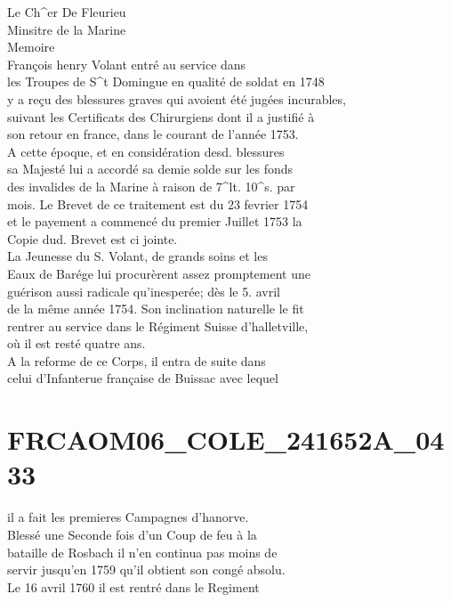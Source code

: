 \documentclass{article}
\begin{document}
\begin{pages}
Le Ch\^{}er De Fleurieu\\
Minsitre de la Marine\\
Memoire\\
François henry Volant entré au service dans\\
les Troupes de S\^{}t Domingue en qualité de soldat en 1748\\
y a reçu des blessures graves qui avoient été jugées incurables,\\
suivant les Certificats des Chirurgiens dont il a justifié à\\
son retour en france, dans le courant de l'année 1753.\\
A cette époque, et en considération desd. blessures\\
sa Majesté lui a accordé sa demie solde sur les fonds\\
des invalides de la Marine à raison de 7\^{}lt. 10\^{}s. par\\
mois. Le Brevet de ce traitement est du 23 fevrier 1754\\
et le payement a commencé du premier Juillet 1753 la\\
Copie dud. Brevet est ci jointe.\\
La Jeunesse du S. Volant, de grands soins et les\\
Eaux de Barége lui procurèrent assez promptement une\\
guérison aussi radicale qu'inesperée; dès le 5. avril\\
de la même année 1754. Son inclination naturelle le fit\\
rentrer au service dans le Régiment Suisse d'halletville,\\
où il est resté quatre ans.\\
A la reforme de ce Corps, il entra de suite dans\\
celui d'Infanterue française de Buissac avec lequel
\pend
\endnumbering\beginnumbering\section{FRCAOM06\_COLE\_241652A\_0433}\pstart
il a fait les premieres Campagnes d'hanorve.\\
Blessé une Seconde fois d'un Coup de feu à la\\
bataille de Rosbach il n'en continua pas moins de\\
servir jusqu'en 1759 qu'il obtient son congé absolu.\\
Le 16 avril 1760 il est rentré dans le Regiment\\

\end{pages}
\end{document}
